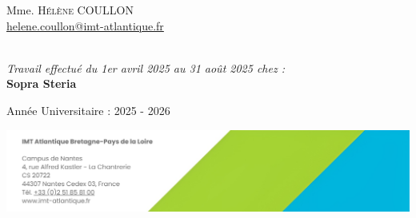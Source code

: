 \begin{titlepage}
\begin{minipage}{0.4\textwidth}
\begin{flushright}
\begin{flushleft}
       \large Mme. \textsc{Hélène COULLON}\\
      \small{\href{mailto:helene.coullon@imt-atlantique.fr}{helene.coullon@imt-atlantique.fr}}\\[0.5cm]
      \end{flushleft}
    \end{flushright}
  \end{minipage}\\[1cm]
  \large \emph{Travail effectué du 1er avril 2025 au 31 août 2025 chez :}\\[0.5cm]
  \textbf{Sopra Steria}
  \vfill
  \begin{flushleft}
  \begin{center}
  {\large Année Universitaire : 2025 - 2026}
  \end{center}
  \end{flushleft}
  \includegraphics[scale=0.4]{figures/IMTA_large.png}
  \end{titlepage}
